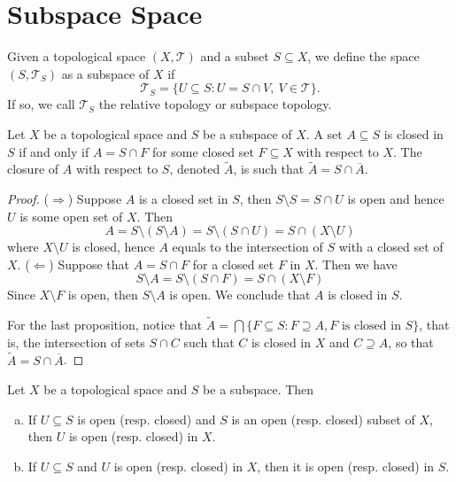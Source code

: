 \section{Subspace Space}

\begin{definition}
  \label{def: subspace topology}
  Given a topological space \((X, \mathcal T)\) and a subset \(S \subseteq X\),
  we define the space \((S, \mathcal T_S)\) as a subspace of \(X\) if
  \[
    \mathcal T_S = \{U \subseteq S: U = S \cap V,\ V \in \mathcal T\}.
  \]
  If so, we call \(\mathcal T_S\) the relative topology or subspace topology.
\end{definition}

\begin{proposition}\label{prop: closed in subspace}
  Let \(X\) be a topological space and \(S\) be a subspace of \(X\). A set \(A
  \subseteq S\) is closed in \(S\) if and only if \(A = S \cap F\) for some
  closed set \(F \subseteq X\) with respect to \(X\). The closure of \(A\) with
  respect to \(S\), denoted \(\widetilde A\), is such that \(\widetilde A = S
  \cap \overline A\).
\end{proposition}

\begin{proof}
  (\(\Rightarrow\)) Suppose \(A\) is a closed set in \(S\), then \(S \setminus
  S = S \cap U\) is open and hence \(U\) is some open set of \(X\). Then
  \[
    A = S \setminus (S \setminus A) = S \setminus (S \cap U)
    = S \cap (X \setminus U)
  \]
  where \(X \setminus U\) is closed, hence \(A\) equals to the intersection of
  \(S\) with a closed set of \(X\).
  (\(\Leftarrow\)) Suppose that \(A = S \cap F\) for a closed set \(F\) in
  \(X\). Then we have
  \[
    S \setminus A = S \setminus (S \cap F) = S \cap (X \setminus F)
  \]
  Since \(X\setminus F\) is open, then \(S \setminus A\) is open. We conclude
  that \(A\) is closed in \(S\).

  For the last proposition, notice that \(\widetilde A = \bigcap \{F \subseteq S
  : F \supseteq A, F \text{ is closed in } S\}\), that is, the intersection of
  sets \(S \cap C\) such that \(C\) is closed in \(X\) and \(C \supseteq A\), so
  that \(\widetilde A = S \cap \overline A\).
\end{proof}

\begin{proposition}\label{prop: relative open to open}
  Let \(X\) be a topological space and \(S\) be a subspace. Then
  \begin{enumerate}[(a)]
    \item If \(U \subseteq S\) is open (resp. closed) and \(S\) is an open
      (resp. closed) subset of \(X\), then \(U\) is open (resp. closed) in
      \(X\).
    \item If \(U \subseteq S\) and \(U\) is open (resp. closed) in \(X\), then
      it is open (resp. closed) in \(S\).
  \end{enumerate}
\end{proposition}

